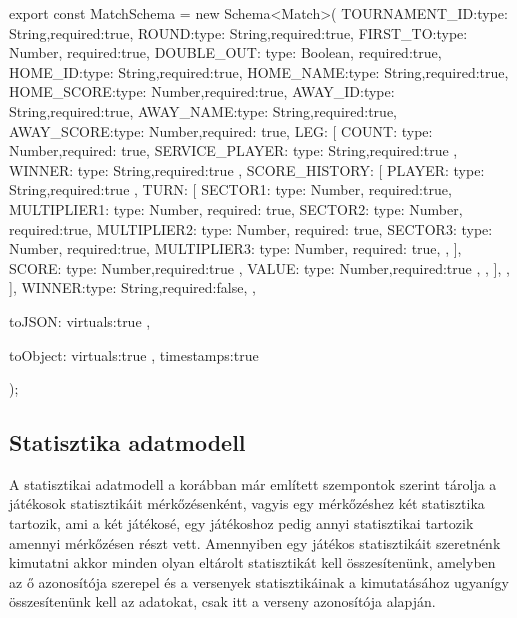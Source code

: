 \begin{cpp}
export const MatchSchema = new Schema<Match>(
    {
        TOURNAMENT_ID:{type: String,required:true},
        ROUND:{type: String,required:true},
        FIRST_TO:{type: Number, required:true},
        DOUBLE_OUT: {type: Boolean, required:true},
        HOME_ID:{type: String,required:true},
        HOME_NAME:{type: String,required:true},
        HOME_SCORE:{type: Number,required:true},
        AWAY_ID:{type: String,required:true},
        AWAY_NAME:{type: String,required:true},
        AWAY_SCORE:{type: Number,required: true},
        LEG:
        [
            {
              COUNT: { type: Number,required: true},
              SERVICE_PLAYER: { type: String,required:true },
              WINNER: { type: String,required:true },
              SCORE_HISTORY: [
                {
                  PLAYER: { type: String,required:true },
                  TURN: [
                    {
                      SECTOR1: { type: Number, required:true},
                      MULTIPLIER1: { type: Number, required: true},
                      SECTOR2: { type: Number, required:true},
                      MULTIPLIER2: { type: Number, required: true},
                      SECTOR3: { type: Number, required:true},
                      MULTIPLIER3: { type: Number, required: true},
                    },
                  ],
                  SCORE: { type: Number,required:true },
                  VALUE: { type: Number,required:true },
                },
              ],
            },
        ],
          WINNER:{type: String,required:false},
    },{
        toJSON:{
            virtuals:true
        },

        toObject:{
            virtuals:true
        },
        timestamps:true
    }
);
\end{cpp}

\subsection{Statisztika adatmodell}
A statisztikai adatmodell a korábban már említett szempontok szerint tárolja a játékosok statisztikáit mérkőzésenként, vagyis egy mérkőzéshez két statisztika tartozik, ami a két játékosé, egy játékoshoz pedig annyi statisztikai tartozik amennyi mérkőzésen részt vett. Amennyiben egy játékos statisztikáit szeretnénk kimutatni akkor minden olyan eltárolt statisztikát kell összesítenünk, amelyben az ő azonosítója szerepel és a versenyek statisztikáinak a kimutatásához ugyanígy összesítenünk kell az adatokat, csak itt a verseny azonosítója alapján.

